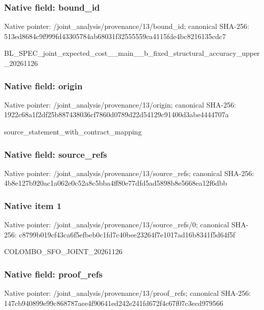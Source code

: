 \documentclass[10pt,a4paper]{article}
\begin{document}
\subsubsection{Native field: bound\_id}


Native pointer: /joint\_analysis/provenance/13/bound\_id; canonical SHA-256: 513ed8684c9f999fd4330578\allowbreak{}4ab68031f32555559ca4115f\allowbreak{}de4bc8216135cdc7


BL\_SPEC\_joint\_expected\_c\allowbreak{}ost\_\_main\_\_b\_fixed\_struc\allowbreak{}tural\_accuracy\_upper\_202\allowbreak{}61126


\subsubsection{Native field: origin}


Native pointer: /joint\_analysis/provenance/13/origin; canonical SHA-256: 1922c68a1f2df25b88743803\allowbreak{}6cf7860d0789d22d54129c91\allowbreak{}400d3abe4444707a


source\_statement\_with\_contract\_mapping


\subsubsection{Native field: source\_refs}


Native pointer: /joint\_analysis/provenan\allowbreak{}ce/13/source\_refs; canonical SHA-256: 4b8e127b920ac1a062e0c52a\allowbreak{}8c5bba4ff80e77dfd5ad5898\allowbreak{}b8e5668ea12f6dbb



\subsubsection{Native item 1}


Native pointer: /joint\_analysis/provenan\allowbreak{}ce/13/source\_refs/0; canonical SHA-256: c8799b019cf43ca6f5efbeb0\allowbreak{}c1fd7c40bee23264f7e1017a\allowbreak{}d16b8341f5d64f5f


COLOMBO\_SFO\_JOINT\_20261126


\subsubsection{Native field: proof\_refs}


Native pointer: /joint\_analysis/provenan\allowbreak{}ce/13/proof\_refs; canonical SHA-256: 147cb940899e99c868787aee\allowbreak{}4f90641ed242e241fd672f4c\allowbreak{}67f07c3ecd979566
\end{document}
